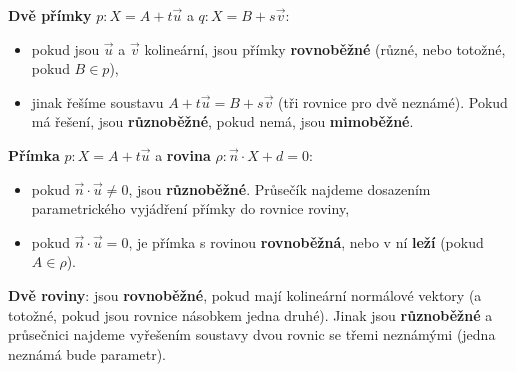 \begin{definitionbox}
  \textbf{Dvě přímky} $p: X = A + t\vec{u}$ a $q: X = B + s\vec{v}$:
  \begin{itemize}
    \item pokud jsou $\vec{u}$ a $\vec{v}$ kolineární, jsou přímky \textbf{rovnoběžné} (různé, nebo totožné, pokud $B\in p$),
    \item jinak řešíme soustavu $A + t\vec{u} = B + s\vec{v}$ (tři rovnice pro dvě neznámé). Pokud má řešení, jsou \textbf{různoběžné}, pokud nemá, jsou \textbf{mimoběžné}.
  \end{itemize}

  \textbf{Přímka} $p: X = A + t\vec{u}$ a \textbf{rovina} $\rho: \vec{n}\cdot X + d = 0$:
  \begin{itemize}
    \item pokud $\vec{n}\cdot\vec{u}\neq 0$, jsou \textbf{různoběžné}. Průsečík najdeme dosazením parametrického vyjádření přímky do rovnice roviny,
    \item pokud $\vec{n}\cdot\vec{u} = 0$, je přímka s rovinou \textbf{rovnoběžná}, nebo v ní \textbf{leží} (pokud $A\in\rho$).
  \end{itemize}

  \textbf{Dvě roviny}: jsou \textbf{rovnoběžné}, pokud mají kolineární normálové vektory (a totožné, pokud jsou rovnice násobkem jedna druhé). Jinak jsou \textbf{různoběžné} a průsečnici najdeme vyřešením soustavy dvou rovnic se třemi neznámými (jedna neznámá bude parametr).
\end{definitionbox}

